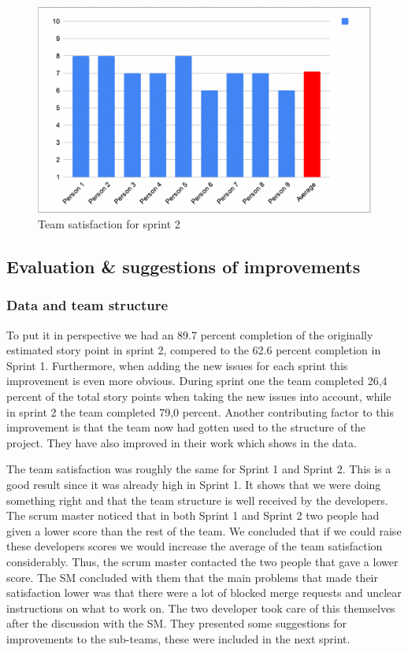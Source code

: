 \documentclass{article}
\begin{document}
\begin{figure}[h!]
    \centering
    \includegraphics[scale=0.6]{pfrFigures/TeamSatisfaction2.png}
    \caption{Team satisfaction for sprint 2}
    \label{fig:Satisfaction2}
\end{figure}

\subsection{Evaluation \& suggestions of improvements} 


\subsubsection{Data and team structure}
To put it in perspective we had an 89.7 percent completion of the originally estimated story point in sprint 2, compered to the 62.6 percent completion in Sprint 1. Furthermore, when adding the new issues for each sprint this improvement is even more obvious. During sprint one the team completed 26,4 percent of the total story points when taking the new issues into account, while in sprint 2 the team completed 79,0 percent. Another contributing factor to this improvement is that the team now had gotten used to the structure of the project. They have also improved in their work which shows in the data. 

The team satisfaction was roughly the same for Sprint 1 and Sprint 2. This is a good result since it was already high in Sprint 1. It shows that we were doing something right and that the team structure is well received by the developers. The scrum master noticed that in both Sprint 1 and Sprint 2 two people had given a lower score than the rest of the team. We concluded that if we could raise these developers scores we would increase the average of the team satisfaction considerably. Thus, the scrum master contacted the two people that gave a lower score. The SM concluded with them that the main problems that made their satisfaction lower was that there were a lot of blocked merge requests and unclear instructions on what to work on. The two developer took care of this themselves after the discussion with the SM. They presented some suggestions for improvements to the sub-teams, these were included in the next sprint.
\end{document}
